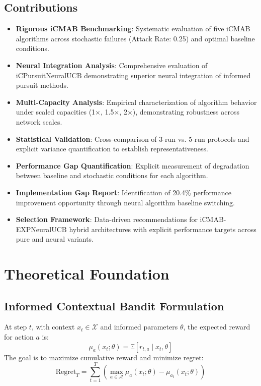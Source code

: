 \documentclass[12pt,a4paper]{article}
\begin{document}
\subsection{Contributions}
\begin{itemize}
\item \textbf{Rigorous iCMAB Benchmarking}: Systematic evaluation of five iCMAB algorithms across stochastic failures (Attack Rate: 0.25) and optimal baseline conditions.
\item \textbf{Neural Integration Analysis}: Comprehensive evaluation of iCPursuitNeuralUCB demonstrating superior neural integration of informed pursuit methods.
\item \textbf{Multi-Capacity Analysis}: Empirical characterization of algorithm behavior under scaled capacities (1$\times$, 1.5$\times$, 2$\times$), demonstrating robustness across network scales.
\item \textbf{Statistical Validation}: Cross-comparison of 3-run vs. 5-run protocols and explicit variance quantification to establish representativeness.
\item \textbf{Performance Gap Quantification}: Explicit measurement of degradation between baseline and stochastic conditions for each algorithm.
\item \textbf{Implementation Gap Report}: Identification of 20.4\% performance improvement opportunity through neural algorithm baseline switching.
\item \textbf{Selection Framework}: Data-driven recommendations for iCMAB-EXPNeuralUCB hybrid architectures with explicit performance targets across pure and neural variants.
\end{itemize}

\section{Theoretical Foundation}

\subsection{Informed Contextual Bandit Formulation}
At step $t$, with context $x_t \in \mathcal{X}$ and informed parameters $\theta$, the expected reward for action $a$ is:
\[
\mu_a(x_t; \theta) = \mathbb{E}[r_{t,a} \mid x_t, \theta]
\]
The goal is to maximize cumulative reward and minimize regret:
\[
\mathrm{Regret}_T = \sum_{t=1}^{T}\left(\max_{a \in \mathcal{A}} \mu_a(x_t;\theta) - \mu_{a_t}(x_t;\theta)\right)
\]
\end{document}
